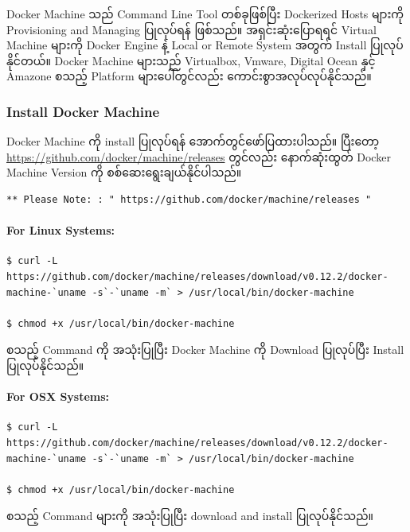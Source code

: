 \documentclass{article}
\begin{document}
Docker Machine သည် Command Line Tool တစ်ခုဖြစ်ပြီး Dockerized Hosts
များကို Provisioning and Managing ပြုလုပ်ရန် ဖြစ်သည်။ အရှင်းဆုံးပြောရရင်
Virtual Machine များကို Docker Engine နဲ့ Local or Remote System အတွက်
Install ပြုလုပ်နိုင်တယ်။ Docker Machine များသည် Virtualbox, Vmware,
Digital Ocean နှင့် Amazone စသည့် Platform များပေါ်တွင်လည်း
ကောင်းစွာအလုပ်လုပ်နိုင်သည်။

\subsubsection{Install Docker Machine}\label{install-docker-machine}

Docker Machine ကို install ပြုလုပ်ရန် အောက်တွင်ဖော်ပြထားပါသည်။ ပြီးတော့
\href{https://github.com/docker/machine/releases}{\url{https://github.com/docker/machine/releases}}
တွင်လည်း နောက်ဆုံးထွတ် Docker Machine Version ကို
စစ်ဆေးရွေးချယ်နိုင်ပါသည်။

\begin{verbatim}
** Please Note: : " https://github.com/docker/machine/releases " 
\end{verbatim}

\paragraph{For Linux Systems:}\label{for-linux-systems}

\begin{verbatim}
$ curl -L https://github.com/docker/machine/releases/download/v0.12.2/docker-machine-`uname -s`-`uname -m` > /usr/local/bin/docker-machine

$ chmod +x /usr/local/bin/docker-machine
\end{verbatim}

စသည့် Command ကို အသုံးပြုပြီး Docker Machine ကို Download ပြုလုပ်ပြီး
Install ပြုလုပ်နိုင်သည်။

\paragraph{For OSX Systems:}\label{for-osx-systems}

\begin{verbatim}
$ curl -L https://github.com/docker/machine/releases/download/v0.12.2/docker-machine-`uname -s`-`uname -m` > /usr/local/bin/docker-machine

$ chmod +x /usr/local/bin/docker-machine
\end{verbatim}

စသည့် Command များကို အသုံးပြုပြီး download and install ပြုလုပ်နိုင်သည်။
\end{document}
